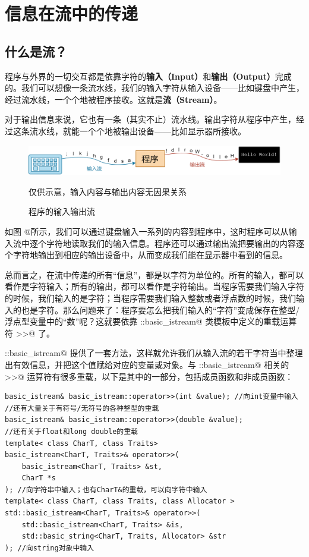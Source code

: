 \section{信息在流中的传递}
\subsection*{什么是流？}
程序与外界的一切交互都是依靠字符的\textbf{输入（Input）}和\textbf{输出（Output）}完成的。我们可以想像一条流水线，我们的输入字符从输入设备——比如键盘中产生，经过流水线，一个个地被程序接收。这就是\textbf{流（Stream）}。\par
对于输出信息来说，它也有一条（其实不止）流水线。输出字符从程序中产生，经过这条流水线，就能一个个地被输出设备——比如显示器所接收。\par
\begin{figure}[htbp]
    \centering
    \includegraphics[width=\textwidth]{../images/generalized_parts/13_input_output_stream.drawio.png}
    \caption{程序的输入输出流}
    \footnotesize{仅供示意，输入内容与输出内容无因果关系}
\end{figure}
如图 @所示，我们可以通过键盘输入一系列的内容到程序中，这时程序可以从输入流中逐个字符地读取我们的输入信息。程序还可以通过输出流把要输出的内容逐个字符地输出到相应的输出设备中，从而变成我们能在显示器中看到的信息。\par
总而言之，在流中传递的所有``信息''，都是以字符为单位的。所有的输入，都可以看作是字符输入；所有的输出，都可以看作是字符输出。当程序需要我们输入字符的时候，我们输入的是字符；当程序需要我们输入整数或者浮点数的时候，我们输入的也是字符。那么问题来了：程序要怎么把我们输入的``字符''变成保存在整型/浮点型变量中的``数''呢？这就要依靠 \lstinline@std::basic_istream@ 类模板中定义的重载运算符 \lstinline@>>@ 了。\par
\lstinline@std::basic_istream@ 提供了一套方法，这样就允许我们从输入流的若干字符当中整理出有效信息，并把这个值赋给对应的变量或对象。与 \lstinline@std::basic_istream@ 相关的 \lstinline@>>@ 运算符有很多重载，以下是其中的一部分，包括成员函数和非成员函数：
\begin{lstlisting}
basic_istream& basic_istream::operator>>(int &value); //向int变量中输入
//还有大量关于有符号/无符号的各种整型的重载
basic_istream& basic_istream::operator>>(double &value);
//还有关于float和long double的重载
template< class CharT, class Traits>
basic_istream<CharT, Traits>& operator>>(
    basic_istream<CharT, Traits> &st,
    CharT *s
); //向字符串中输入；也有CharT&的重载，可以向字符中输入
template< class CharT, class Traits, class Allocator >
std::basic_istream<CharT, Traits>& operator>>(
    std::basic_istream<CharT, Traits> &is,
    std::basic_string<CharT, Traits, Allocator> &str
); //向string对象中输入
\end{lstlisting}
